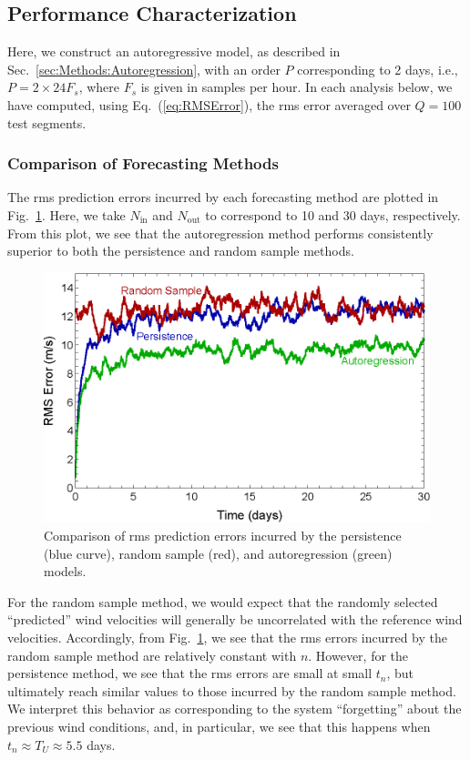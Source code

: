 \documentclass[11pt, oneside]{article}
\newcommand{\figref}[1]{Fig.~\ref{#1}}
\newcommand{\eqnref}[1]{Eq.~(\ref{#1})}
\newcommand{\secref}[1]{Sec.~\ref{#1}}
\begin{document}
\subsection{Performance Characterization}
Here, we construct an autoregressive model, as described in \secref{sec:Methods:Autoregression}, with an order $P$ corresponding to 2 days, i.e., $P = 2 \times 24 F_s$, where $F_s$ is given in samples per hour.
In each analysis below, we have computed, using \eqnref{eq:RMSError}, the rms error averaged over $Q = 100$ test segments.

\subsubsection{Comparison of Forecasting Methods}\label{sec:Results:Comparison}
The rms prediction errors incurred by each forecasting method are plotted in \figref{fig:ComparisonRMS}.
Here, we take $N_\text{in}$ and $N_\text{out}$ to correspond to 10 and 30 days, respectively.
From this plot, we see that the autoregression method performs consistently superior to both the persistence and random sample methods.

\begin{figure}[htb]
\centering
\includegraphics[width=0.7\columnwidth]{figures/ComparisonRMSPredictionError}
\caption{Comparison of rms prediction errors incurred by the persistence (blue curve), random sample (red), and autoregression (green) models.}
\label{fig:ComparisonRMS}
\end{figure}

For the random sample method, we would expect that the randomly selected ``predicted'' wind velocities will generally be uncorrelated with the reference wind velocities.
Accordingly, from \figref{fig:ComparisonRMS}, we see that the rms errors incurred by the random sample method are relatively constant with $n$.
However, for the persistence method, we see that the rms errors are small at small $t_n$, but ultimately reach similar values to those incurred by the random sample method.
We interpret this behavior as corresponding to the system ``forgetting'' about the previous wind conditions, and, in particular, we see that this happens when $t_n \approx T_U \approx 5.5$ days.
\end{document}
